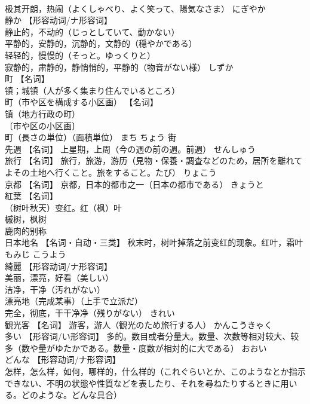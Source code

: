 \documentclass[8pt]{extreport}
\begin{document}
\begin{CJK}{UTF8}{min}
\\	极其开朗，热闹（よくしゃべり、よく笑って、陽気なさま）	にぎやか	
\\	静か	【形容动词/ナ形容词】 
\\	静止的，不动的（じっとしていて、動かない） 
\\	平静的，安静的，沉静的，文静的（穏やかである） 
\\	轻轻的，慢慢的（そっと。ゆっくりと） 
\\	寂静的，肃静的，静悄悄的，平静的（物音がない様）	しずか	
\\	町	【名词】 
\\	镇；城镇（人が多く集まり住んでいるところ） 
\\	町（市や区を構成する小区画） 【名词】 
\\	镇（地方行政の町） 
\\	〔市や区の小区画〕 
\\	町（長さの単位）（面積単位）	まち ちょう	街
\\	先週	【名词】 上星期，上周（今の週の前の週。前週）	せんしゅう	
\\	旅行	【名词】 旅行，旅游，游历（見物・保養・調査などのため，居所を離れてよその土地へ行くこと。旅をすること。たび）	りょこう	
\\	京都	【名词】 京都，日本的都市之一（日本の都市である）	きょうと	
\\	紅葉	【名词】 
\\	（树叶秋天）变红。红（枫）叶 
\\	槭树，枫树 
\\	鹿肉的别称 
\\	日本地名 【名词・自动・三类】 秋末时，树叶掉落之前变红的现象。红叶，霜叶	もみじ こうよう	
\\	綺麗	【形容动词/ナ形容词】 
\\	美丽，漂亮，好看（美しい） 
\\	洁净，干净（汚れがない） 
\\	漂亮地（完成某事）（上手で立派だ） 
\\	完全，彻底，干干净净（残りがない）	きれい	
\\	観光客	【名词】 游客，游人（観光のため旅行する人）	かんこうきゃく	
\\	多い	【形容词/い形容词】 多的。数目或者分量大。数量、次数等相对较大、较多（数や量がゆたかである。数量・度数が相対的に大である）	おおい	
\\	どんな	【形容动词/ナ形容词】 
\\	怎样，怎么样，如何，哪样的，什么样的（これぐらいとか、このようなとか指示できない、不明の状態や性質などを表したり、それを尋ねたりするときに用いる。どのような。どんな具合） 

\end{CJK}
\end{document}
